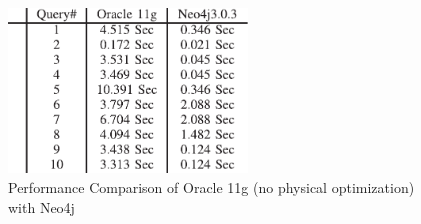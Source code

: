 \documentclass[10pt,        %
               a4paper,     %
               journal,     %
               ]{IEEEtran}
\begin{document}
\begin{figure}[!t]
	\centering
	\includegraphics[width=2.5in]{plots/no tuning table}
	\caption{Performance Comparison of Oracle 11g (no physical optimization) with Neo4j \cite{IEEEpaper1:comparison}}
	\label{table_no_phys_vs_neo4j}
\end{figure}

%


%
%
\end{document}

